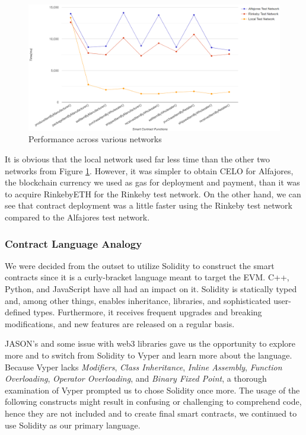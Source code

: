 \vspace{.5cm}

\begin{figure}[h]
\centering
  \includegraphics[width=15cm]{includes/figures/graph.png} 
  \caption{Performance across various networks}
  \label{Testing on networks}
\end{figure}

\vspace{.5cm}

It is obvious that the local network used far less time than the other two networks from Figure \ref{Testing on networks}. However, it was simpler to obtain CELO for Alfajores, the blockchain currency we used as gas for deployment and payment, than it was to acquire RinkebyETH for the Rinkeby test network. On the other hand, we can see that contract deployment was a little faster using the Rinkeby test network compared to the Alfajores test network.

\subsubsection{Contract Language Analogy}

We were decided from the outset to utilize Solidity to construct the smart contracts since it is a curly-bracket language meant to target the \ac{EVM}. C++, Python, and JavaScript have all had an impact on it. Solidity is statically typed and, among other things, enables inheritance, libraries, and sophisticated user-defined types. Furthermore, it receives frequent upgrades and breaking modifications, and new features are released on a regular basis. 

\vspace{.5cm}

JASON's and some issue with web3 libraries gave us the opportunity to explore more and to switch from Solidity to Vyper and learn more about the language. Because Vyper lacks \textit{Modifiers}, \textit{Class Inheritance}, \textit{Inline Assembly}, \textit{Function Overloading}, \textit{Operator Overloading}, and \textit{Binary Fixed Point}, a thorough examination of Vyper prompted us to chose Solidity once more. The usage of the following constructs might result in confusing or challenging to comprehend code, hence they are not included and to create final smart contracts, we continued to use Solidity as our primary language.

